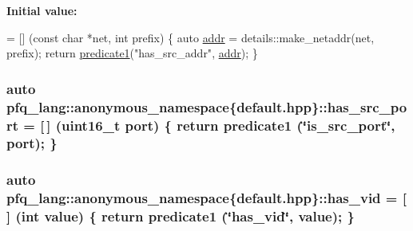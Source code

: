 {\bfseries Initial value\+:}
\begin{DoxyCode}
= [] (\textcolor{keyword}{const} \textcolor{keywordtype}{char} *net, \textcolor{keywordtype}{int} prefix)
        \{
            \textcolor{keyword}{auto} \hyperlink{namespacepfq__lang_1_1anonymous__namespace_02default_8hpp_03_aafce8334d1be83bff9a2115439c8c453}{addr} = details::make\_netaddr(net, prefix);
            \textcolor{keywordflow}{return} \hyperlink{namespacepfq__lang_ae23a03cee94b5ddfde4a8d2e5c521f0e}{predicate1}(\textcolor{stringliteral}{"has\_src\_addr"}, \hyperlink{namespacepfq__lang_1_1anonymous__namespace_02default_8hpp_03_aafce8334d1be83bff9a2115439c8c453}{addr});
        \}
\end{DoxyCode}
\hypertarget{namespacepfq__lang_1_1anonymous__namespace_02default_8hpp_03_ad6d8ed8e08a448b3bf5d23a929d887f9}{
\subsubsection[{has\+\_\+src\+\_\+port}]{\setlength{\rightskip}{0pt plus 5cm}auto pfq\+\_\+lang\+::anonymous\+\_\+namespace\{default.\+hpp\}\+::has\+\_\+src\+\_\+port = \mbox{[}$\,$\mbox{]} (uint16\+\_\+t {\bf port}) \{ return {\bf predicate1} (\char`\"{}is\+\_\+src\+\_\+port\char`\"{}, port); \}}}\label{namespacepfq__lang_1_1anonymous__namespace_02default_8hpp_03_ad6d8ed8e08a448b3bf5d23a929d887f9}
\hypertarget{namespacepfq__lang_1_1anonymous__namespace_02default_8hpp_03_adddd2dea56164719f2853af158911a80}{
\subsubsection[{has\+\_\+vid}]{\setlength{\rightskip}{0pt plus 5cm}auto pfq\+\_\+lang\+::anonymous\+\_\+namespace\{default.\+hpp\}\+::has\+\_\+vid = \mbox{[}$\,$\mbox{]} (int value) \{ return {\bf predicate1} (\char`\"{}has\+\_\+vid\char`\"{}, value); \}}}\label{namespacepfq__lang_1_1anonymous__namespace_02default_8hpp_03_adddd2dea56164719f2853af158911a80}
